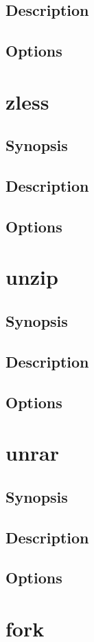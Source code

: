 \documentclass[a4paper, 10pt, onecolumn, openright, oneside]{book}
\begin{document}
			\subsection{Description}
			\subsection{Options}
		\section{zless}
			\subsection{Synopsis}
			\subsection{Description}
			\subsection{Options}
		\section{unzip}
			\subsection{Synopsis}
			\subsection{Description}
			\subsection{Options}
		\section{unrar}
			\subsection{Synopsis}
			\subsection{Description}
			\subsection{Options}
		\section{fork}
\end{document}

